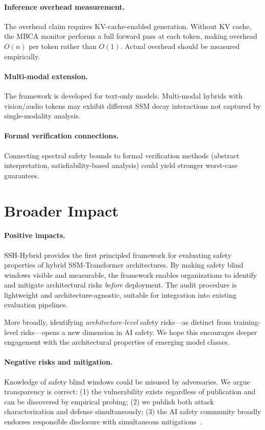 \documentclass{article}
\begin{document}
\paragraph{Inference overhead measurement.}
The overhead claim requires KV-cache-enabled generation. Without KV cache, the MBCA monitor performs a full forward pass at each token, making overhead $O(n)$ per token rather than $O(1)$. Actual overhead should be measured empirically.

\paragraph{Multi-modal extension.}
The framework is developed for text-only models. Multi-modal hybrids with vision/audio tokens may exhibit different SSM decay interactions not captured by single-modality analysis.

\paragraph{Formal verification connections.}
Connecting spectral safety bounds to formal verification methods (abstract interpretation, satisfiability-based analysis) could yield stronger worst-case guarantees.

\section{Broader Impact}
\label{sec:broader_impact}

\paragraph{Positive impacts.}
SSH-Hybrid provides the first principled framework for evaluating safety properties of hybrid SSM-Transformer architectures. By making safety blind windows visible and measurable, the framework enables organizations to identify and mitigate architectural risks \emph{before} deployment. The audit procedure is lightweight and architecture-agnostic, suitable for integration into existing evaluation pipelines.

More broadly, identifying \emph{architecture-level} safety risks---as distinct from training-level risks---opens a new dimension in AI safety. We hope this encourages deeper engagement with the architectural properties of emerging model classes.

\paragraph{Negative risks and mitigation.}
Knowledge of safety blind windows could be misused by adversaries. We argue transparency is correct: (1) the vulnerability exists regardless of publication and can be discovered by empirical probing; (2) we publish both attack characterization and defense simultaneously; (3) the AI safety community broadly endorses responsible disclosure with simultaneous mitigations~\cite{carlini2024aligned}.
\end{document}
